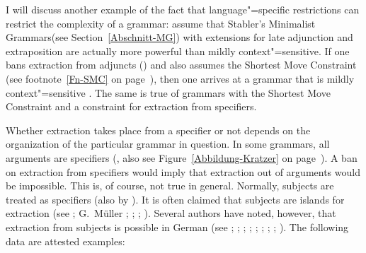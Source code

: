 I will discuss another example of the fact that language"=specific restrictions can restrict the complexity of a grammar:
\citet[Section~3.2]{GM2007a} assume that Stabler's Minimalist Grammars\indexmg (see
Section~\ref{Abschnitt-MG}) with extensions for late adjunction and extraposition are actually more powerful than mildly context"=sensitive.
If one bans extraction from adjuncts (\citealp[]{FG2002a}) and also assumes the Shortest Move Constraint (see
footnote~\ref{Fn-SMC} on page~\pageref{Fn-SMC}), then one arrives at a grammar that is mildly context"=sensitive
\citep[]{GM2007a}.
The same is true of grammars with the Shortest Move Constraint and a constraint for extraction from specifiers.

Whether extraction takes place from a specifier or not depends on the organization of the particular grammar in question.
In some grammars, all arguments are specifiers (\citealp[--123]{Kratzer96a}, also see
Figure~\ref{Abbildung-Kratzer} on page~\pageref{Abbildung-Kratzer}). A ban on extraction from
specifiers would imply that extraction out of arguments would be impossible. This is, of course, not
true in general. Normally, subjects are treated as specifiers (also by \citealp[]{FG2002a}). It is often claimed that subjects
are islands for extraction (see \citealp[, ]{Grewendorf89a}; G.\ Müller %
\citeyear[]{GMueller96b}; \citeyear[, ]{GMueller98a};
%
\citealp[]{Sabel99a}; \citealp[]{Fanselow2001a}).
Several\label{page-extraction-out-of-subjects} authors have noted, however, that extraction from subjects is possible in German (see \citealp[]{Duerscheid89a}; \citealp*[]{Haider93a};
\citealp{Pafel93b-u}; \citealp[]{Fortmann96a-u}; \citealp[]{Suchsland97a};
\citealp[]{VS98a}; \citealp[]{Ballweg97a}; \citealp[--101]{Mueller99a}; \citealp[]{deKuthy2002a}).
The following data are attested examples:%
\newpage
